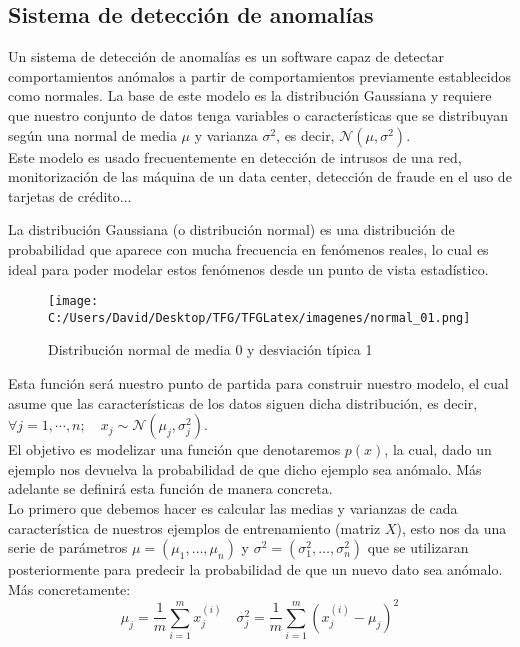 \subsection{Sistema de detección de anomalías}
Un sistema de detección de anomalías es un software capaz de detectar comportamientos anómalos a 
partir de comportamientos previamente establecidos como normales.
La base de este modelo es la distribución Gaussiana y requiere que nuestro conjunto de 
datos tenga variables o características que se distribuyan según una normal de media $\mu$ y  
varianza $\sigma^2$, es decir, $\mathcal{N}(\mu, \sigma^2)$.\\
Este modelo es usado frecuentemente en detección de intrusos de una red, monitorización de las 
máquina de un data center, detección de fraude en el uso de tarjetas de crédito...
\newline

La distribución Gaussiana (o distribución normal) 
es una distribución de probabilidad que aparece con mucha frecuencia en fenómenos reales, lo cual es ideal 
para poder modelar estos fenómenos desde un punto de vista estadístico.

\begin{figure}[h]
  \centering
  \texttt{[image: C:/Users/David/Desktop/TFG/TFGLatex/imagenes/normal\_01.png]}
  \caption[$\mathcal{N}(0,1)$]{Distribución normal de media 0 y desviación típica 1}
  \label{normal_01}
\end{figure}

Esta función será nuestro punto de partida para construir nuestro modelo, el cual asume que las 
características de los datos siguen dicha distribución, es decir, 
$\forall j=1,\cdots,n; \quad x_j \sim \mathcal{N}(\mu_j, \sigma_j^2)$.\\

El objetivo es modelizar una función que denotaremos $p(x)$, la cual, dado un ejemplo nos devuelva la 
probabilidad de que dicho ejemplo sea anómalo. Más adelante se definirá esta función de manera 
concreta.\\
Lo primero que debemos hacer es calcular las medias y varianzas de cada característica de nuestros 
ejemplos de entrenamiento (matriz $X$), esto nos da una serie de parámetros 
$\mu = (\mu_1, \ldots, \mu_n) $ y 
$\sigma^2 = (\sigma_1^2, \ldots, \sigma_n^2) $ 
que se utilizaran posteriormente para predecir la probabilidad de que un nuevo dato sea anómalo. 
Más concretamente:
$$ \mu_j = \frac{1}{m}\sum_{i=1}^{m}x_j^{(i)} \quad 
   \sigma_j^2 = \frac{1}{m}\sum_{i=1}^{m}(x_j^{(i)} - \mu_j)^2 $$

